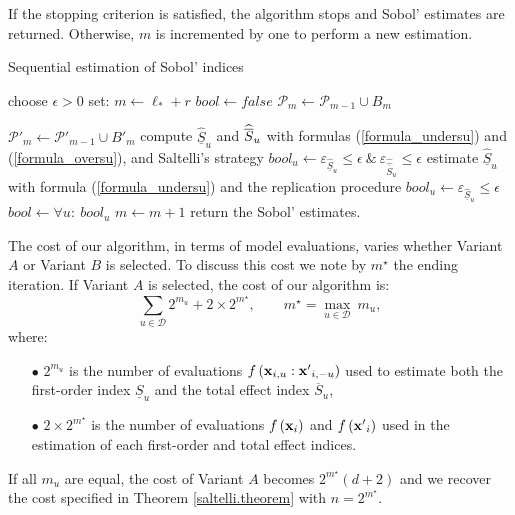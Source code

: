 If the stopping criterion is satisfied, the algorithm stops and Sobol' estimates are returned. Otherwise, $m$ is incremented by one to perform a new estimation. 
\begin{algorithm}[!ht]
\caption{Sequential estimation of Sobol' indices}
\begin{algorithmic}[1]
\vspace*{0.2cm}
\State choose $\epsilon >0$
\State set: $m \leftarrow \ell_*+r$
\State $bool \leftarrow false$
\State $\mathcal{P}_m \leftarrow \mathcal{P}_{m-1} \cup B_m$

\hspace*{-0.3cm} $\mathcal{P}'_m \leftarrow \mathcal{P}'_{m-1} \cup {B'}_m$
\State compute $\widehat{\underline{S}}_u$ and $\widehat{\ov{$S$}}_u$ with formulas (\ref{formula_undersu}) and (\ref{formula_oversu}), and Saltelli's strategy
\State $bool_u \leftarrow \varepsilon_{\widehat{\underline{S}}_u} \leq \epsilon \ \& \ \varepsilon_{\widehat{\widehat{\overline{S}}}_u} \leq \epsilon$
\EndIf
{}
\State estimate $\widehat{\underline{S}}_u$ with formula (\ref{formula_undersu}) and the replication procedure
\State $bool_u \leftarrow \varepsilon_{\widehat{\underline{S}}_u} \leq \epsilon$
\EndIf
\EndFor
\State $bool \leftarrow \forall u: \ bool_u$
\State $m \leftarrow m + 1$
\EndWhile
\State return the Sobol' estimates.
\end{algorithmic}
\label{recursive.algorithm}
\end{algorithm}
\bigskip

The cost of our algorithm, in terms of model evaluations, varies whether Variant $A$ or Variant $B$ is selected. To discuss this cost we note by $m^\star$ the ending iteration. If Variant $A$ is selected, the cost of our algorithm is:
\[\sum \limits_{u \in \mathcal{D}} 2^{m_u} + 2 \times 2^{m^{\star}}, \qquad m^\star= \max \limits_{u \in \mathcal{D}} \ m_u,\]
where: 
\begin{itemize}
\item[$\bullet$] $2^{m_u}$ is the number of evaluations $f\left(\boldsymbol{\mathbf{x}}_{i,u}:{\boldsymbol{\mathbf{x}}'}_{i,-u}\right)$ used to estimate both the first-order index $\underline{S}_u$ and the total effect index $\overline{S}_u$,
\item[$\bullet$] $2 \times 2^{m^{\star}}$ is the number of evaluations $f\left(\boldsymbol{\mathbf{x}}_{i}\right)$ and $f\left({\boldsymbol{\mathbf{x}}'}_{i}\right)$ used in the estimation of each first-order and total effect indices.
\end{itemize}
If all $m_u$ are equal, the cost of Variant $A$ becomes $2^{m^\star}(d+2)$ and we recover the cost specified in Theorem \ref{saltelli.theorem} with $n=2^{m^\star}$.

